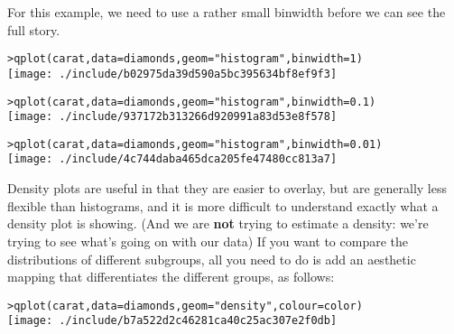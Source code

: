 For this example, we need to use a rather small binwidth before we can see the full story.

\begin{alltt}
> qplot(carat, data = diamonds, geom = "histogram", binwidth = 1)
\texttt{[image: ./include/b02975da39d590a5bc395634bf8ef9f3]}

> qplot(carat, data = diamonds, geom = "histogram", binwidth = 0.1)
\texttt{[image: ./include/937172b313266d920991a83d53e8f578]}

> qplot(carat, data = diamonds, geom = "histogram", binwidth = 0.01)
\texttt{[image: ./include/4c744daba465dca205fe47480cc813a7]}

\end{alltt}

Density plots are useful in that they are easier to overlay, but are generally less flexible than histograms, and it is more difficult to understand exactly what a density plot is showing.  (And we are {\bf not} trying to estimate a density: we're trying to see what's going on with our data)  If you want to compare the distributions of different subgroups, all you need to do is add an aesthetic mapping that differentiates the different groups, as follows:

\begin{alltt}
> qplot(carat, data = diamonds, geom = "density", colour = color)
\texttt{[image: ./include/b7a522d2c46281ca40c25ac307e2f0db]}

\end{alltt}

